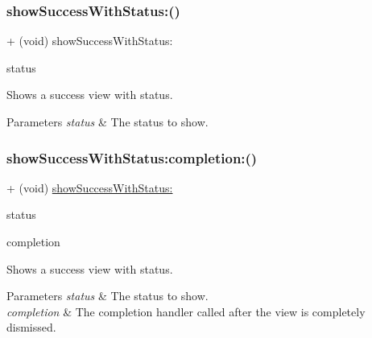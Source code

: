 \subsubsection{\texorpdfstring{show\+Success\+With\+Status\+:()}{showSuccessWithStatus:()}\hspace{0.1cm}{\footnotesize\ttfamily [3/3]}}
{\footnotesize\ttfamily + (void) show\+Success\+With\+Status\+: \begin{DoxyParamCaption}\item[{(N\+S\+String $\ast$)}]{status }\end{DoxyParamCaption}}

Shows a success view with {\ttfamily status}. 
\begin{DoxyParams}{Parameters}
{\em status} & The status to show. \\
\hline
\end{DoxyParams}
\mbox{\label{interface_k_v_n_progress_aa4d2366ad5664f42a3c9214f97e4d373}} 
\subsubsection{\texorpdfstring{show\+Success\+With\+Status\+:completion\+:()}{showSuccessWithStatus:completion:()}\hspace{0.1cm}{\footnotesize\ttfamily [1/3]}}
{\footnotesize\ttfamily + (void) \mbox{\hyperlink{interface_k_v_n_progress_ae9b8b57302f6a4456658e758784790bf}{show\+Success\+With\+Status\+:}} \begin{DoxyParamCaption}\item[{(N\+S\+String $\ast$)}]{status }\item[{completion:(K\+V\+N\+Completion\+Block)}]{completion }\end{DoxyParamCaption}}

Shows a success view with {\ttfamily status}. 
\begin{DoxyParams}{Parameters}
{\em status} & The status to show. \\
\hline
{\em completion} & The completion handler called after the view is completely dismissed. \\
\hline
\end{DoxyParams}
\mbox{\label{interface_k_v_n_progress_aa4d2366ad5664f42a3c9214f97e4d373}} 

